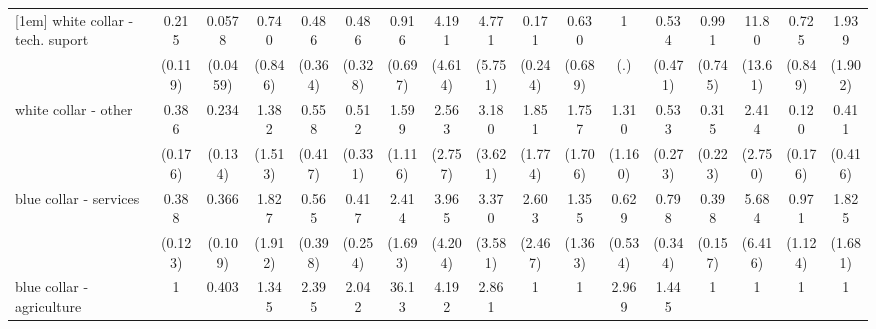 {\begin{tabular}{l*{16}{c}}
[1em]
white collar - tech. suport&       0.215\sym{**} &      0.0578\sym{***}&       0.740         &       0.486         &       0.486         &       0.916         &       4.191         &       4.771         &       0.171         &       0.630         &           1         &       0.534         &       0.991         &       11.80\sym{*}  &       0.725         &       1.939         \\
                    &     (0.119)         &    (0.0459)         &     (0.846)         &     (0.364)         &     (0.328)         &     (0.697)         &     (4.614)         &     (5.751)         &     (0.244)         &     (0.689)         &         (.)         &     (0.471)         &     (0.745)         &     (13.61)         &     (0.849)         &     (1.902)         \\
[1em]
white collar - other&       0.386\sym{*}  &       0.234\sym{*}  &       1.382         &       0.558         &       0.512         &       1.599         &       2.563         &       3.180         &       1.851         &       1.757         &       1.310         &       0.533         &       0.315         &       2.414         &       0.120         &       0.411         \\
                    &     (0.176)         &     (0.134)         &     (1.513)         &     (0.417)         &     (0.331)         &     (1.116)         &     (2.757)         &     (3.621)         &     (1.774)         &     (1.706)         &     (1.160)         &     (0.273)         &     (0.223)         &     (2.750)         &     (0.176)         &     (0.416)         \\
[1em]
blue collar - services&       0.388\sym{**} &       0.366\sym{***}&       1.827         &       0.565         &       0.417         &       2.414         &       3.965         &       3.370         &       2.603         &       1.355         &       0.629         &       0.798         &       0.398\sym{*}  &       5.684         &       0.971         &       1.825         \\
                    &     (0.123)         &     (0.109)         &     (1.912)         &     (0.398)         &     (0.254)         &     (1.693)         &     (4.204)         &     (3.581)         &     (2.467)         &     (1.363)         &     (0.534)         &     (0.344)         &     (0.157)         &     (6.416)         &     (1.124)         &     (1.681)         \\
[1em]
blue collar - agriculture&           1         &       0.403         &       1.345         &       2.395         &       2.042         &       36.13\sym{*}  &       4.192         &       2.861         &           1         &           1         &       2.969         &       1.445         &           1         &           1         &           1         &           1         \\

\end{tabular}}
